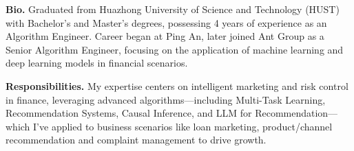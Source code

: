%
%

\par{
{\textbf{Bio.}} 
Graduated from Huazhong University of Science and Technology (HUST) with Bachelor's and Master's degrees, possessing 4 years of experience as an Algorithm Engineer. Career began at Ping An, later joined Ant Group as a Senior Algorithm Engineer, focusing on the application of machine learning and deep learning models in financial scenarios.

{\textbf{Responsibilities.}} 
My expertise centers on intelligent marketing and risk control in finance, leveraging advanced algorithms—including Multi-Task Learning, Recommendation Systems, Causal Inference, and LLM for Recommendation—which I've applied to business scenarios like loan marketing, product/channel recommendation and complaint management to drive growth.
}